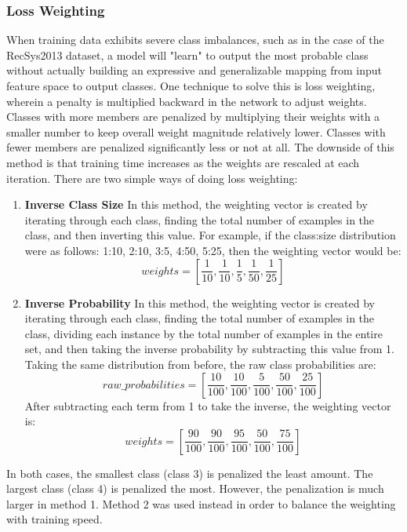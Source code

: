 \subsubsection{\textbf{Loss Weighting}}
When training data exhibits severe class imbalances, such as in the case of the RecSys2013 dataset, a model will "learn" to output the most probable class without actually building an expressive and generalizable mapping from input feature space to output classes. One technique to solve this is loss weighting, wherein a penalty is multiplied backward in the network to adjust weights. Classes with more members are penalized by multiplying their weights with a smaller number to keep overall weight magnitude relatively lower. Classes with fewer members are penalized significantly less or not at all. The downside of this method is that training time increases as the weights are rescaled at each iteration. There are two simple ways of doing loss weighting:
\begin{enumerate}
	\item \textbf{Inverse Class Size} In this method, the weighting vector is created by iterating through each class, finding the total number of examples in the class, and then inverting this value. For example, if the class:size distribution were as follows: {1:10, 2:10, 3:5, 4:50, 5:25}, then the weighting vector would be:
	\begin{equation}
	weights = [\frac{1}{10}, \frac{1}{10}, \frac{1}{5}, \frac{1}{50}, \frac{1}{25}]
	\end{equation}
	
	\item \textbf{Inverse Probability}  In this method, the weighting vector is created by iterating through each class, finding the total number of examples in the class, dividing each instance by the total number of examples in the entire set, and then taking the inverse probability by subtracting this value from 1. Taking the same distribution from before, the raw class probabilities are:
	\begin{equation}
	raw\_probabilities = [\frac{10}{100}, \frac{10}{100}, \frac{5}{100}, \frac{50}{100}, \frac{25}{100}]
	\end{equation}
	After subtracting each term from 1 to take the inverse, the weighting vector is:
	\begin{equation}
	weights = [\frac{90}{100}, \frac{90}{100}, \frac{95}{100}, \frac{50}{100}, \frac{75}{100}]
	\end{equation}
\end{enumerate}
In both cases, the smallest class (class 3) is penalized the least amount. The largest class (class 4) is penalized the most. However, the penalization is much larger in method 1. Method 2 was used instead in order to balance the weighting with training speed.

